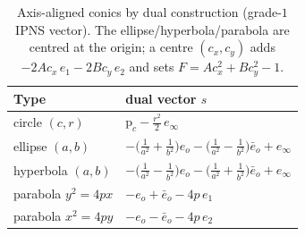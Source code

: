 \documentclass{birkjour}
\theoremstyle{definition}
\theoremstyle{remark}
\newcommand{\einf}{e_\infty}
\newcommand{\eobar}{\bar e_o}
\begin{document}
\begin{table}[H]
\centering
\caption{Axis-aligned conics by dual construction (grade-$1$ IPNS vector). The
ellipse/hyperbola/parabola are centred at the origin; a centre $(c_x,c_y)$ adds
$-2A c_x\,e_1 - 2B c_y\,e_2$ and sets $F = A c_x^2 + B c_y^2 - 1$.}
\label{tab:dual-axis-conics}
\begin{tabular}{@{}ll@{}}
\toprule
Type & dual vector $s$ \\
\midrule
circle $(c,r)$         & $\mathrm{p}_c - \tfrac{r^2}{2}\,\einf$ \\[2pt]
ellipse $(a,b)$        & $-\big(\tfrac1{a^2}+\tfrac1{b^2}\big)e_o - \big(\tfrac1{a^2}-\tfrac1{b^2}\big)\eobar + \einf$ \\[2pt]
hyperbola $(a,b)$      & $-\big(\tfrac1{a^2}-\tfrac1{b^2}\big)e_o - \big(\tfrac1{a^2}+\tfrac1{b^2}\big)\eobar + \einf$ \\[2pt]
parabola $y^2{=}4px$   & $-e_o + \eobar - 4p\,e_1$ \\
parabola $x^2{=}4py$   & $-e_o - \eobar - 4p\,e_2$ \\
\bottomrule
\end{tabular}
\end{table}
\end{document}
